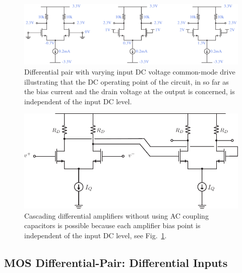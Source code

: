\begin{figure}[tb]
\begin{center}
\includegraphics[width=\columnwidth]{diff_amp_bias_cm.pdf}
\end{center}
\caption{Differential pair with varying input DC voltage common-mode drive illustrating that the DC operating point of the circuit, in so far as the bias current and the drain voltage at the output is concerned, is independent of the input DC level.} \label{fig:diff_amp_bias_cm.pdf}
\end{figure}




\begin{figure}[tb]
\begin{center}
\includegraphics[scale=.8]{Diff_Cascade.pdf}
\end{center}
\caption{Cascading differential amplifiers without using AC coupling capacitors is possible because each amplifier bias point is independent of the input DC level, see Fig.~\ref{fig:diff_amp_bias_cm.pdf}.} \label{fig:Diff_Cascade.pdf}
\end{figure}
 






\subsection{MOS Differential-Pair:  Differential Inputs}



